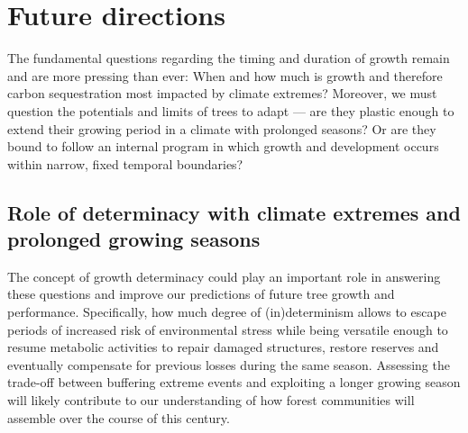 \documentclass{article}
\begin{document}
\section*{Future directions}
The fundamental questions regarding the timing and duration of growth remain and are more pressing than ever: When and how much is growth and therefore carbon sequestration most impacted by climate extremes? Moreover, we must question the potentials and limits of trees to adapt --- are they plastic enough to extend their growing period in a climate with prolonged seasons? Or are they bound to follow an internal program in which growth and development occurs within narrow, fixed temporal boundaries? 

\subsection*{Role of determinacy with climate extremes and prolonged growing seasons} %
The concept of growth determinacy could play an important role in answering these questions and improve our predictions of future tree growth and performance. Specifically, how much degree of (in)determinism allows to escape periods of increased risk of environmental stress while being versatile enough to resume metabolic activities to repair damaged structures, restore reserves and eventually compensate for previous losses during the same season. Assessing the trade-off between buffering extreme events and exploiting a longer growing season will likely contribute to our understanding of how forest communities will assemble over the course of this century.\\
\end{document}
